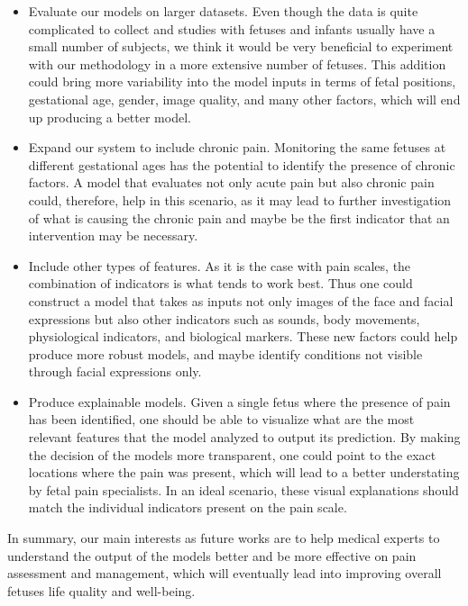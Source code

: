 \begin{itemize}
    \item Evaluate our models on larger datasets. Even though the data is quite complicated to collect and studies with fetuses and infants usually have a small number of subjects, we think it would be very beneficial to experiment with our methodology in a more extensive number of fetuses. This addition could bring more variability into the model inputs in terms of fetal positions, gestational age, gender, image quality, and many other factors, which will end up producing a better model.
    
    \item Expand our system to include chronic pain. Monitoring the same fetuses at different gestational ages has the potential to identify the presence of chronic factors. A model that evaluates not only acute pain but also chronic pain could, therefore, help in this scenario, as it may lead to further investigation of what is causing the chronic pain and maybe be the first indicator that an intervention may be necessary.

    \item Include other types of features. As it is the case with pain scales, the combination of indicators is what tends to work best. Thus one could construct a model that takes as inputs not only images of the face and facial expressions but also other indicators such as sounds, body movements, physiological indicators, and biological markers. These new factors could help produce more robust models, and maybe identify conditions not visible through facial expressions only.
    
    \item Produce explainable models. Given a single fetus where the presence of pain has been identified, one should be able to visualize what are the most relevant features that the model analyzed to output its prediction. By making the decision of the models more transparent, one could point to the exact locations where the pain was present, which will lead to a better understating by fetal pain specialists. In an ideal scenario, these visual explanations should match the individual indicators present on the pain scale.

\end{itemize}

In summary, our main interests as future works are to help medical experts to understand the output of the models better and be more effective on pain assessment and management, which will eventually lead into improving overall fetuses life quality and well-being.
